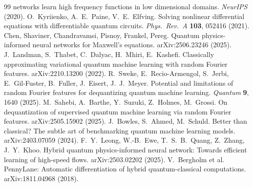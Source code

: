 \documentclass[11pt]{article}
\begin{document}
\begin{thebibliography}{99}
  networks learn high frequency functions in low dimensional domains. \emph{NeurIPS}
  (2020).
 O.~Kyriienko, A.~E.~Paine, V.~E.~Elfving. Solving nonlinear differential
  equations with differentiable quantum circuits. \emph{Phys.\ Rev.\ A} \textbf{103},
  052416 (2021).
 Chen, Shaviner, Chandravamsi, Pisnoy, Frankel, Pereg. Quantum
  physics-informed neural networks for Maxwell's equations. arXiv:2506.23246 (2025).
 J.~Landman, S.~Thabet, C.~Dalyac, H.~Mhiri, E.~Kashefi. Classically
  approximating variational quantum machine learning with random Fourier features.
  arXiv:2210.13200 (2022).
 R.~Sweke, E.~Recio-Armengol, S.~Jerbi, E.~Gil-Fuster, B.~Fuller,
  J.~Eisert, J.~J.~Meyer. Potential and limitations of random Fourier features for
  dequantizing quantum machine learning. \emph{Quantum} \textbf{9}, 1640 (2025).
 M.~Sahebi, A.~Barthe, Y.~Suzuki, Z.~Holmes, M.~Grossi. On
  dequantization of supervised quantum machine learning via random Fourier features.
  arXiv:2505.15902 (2025).
 J.~Bowles, S.~Ahmed, M.~Schuld. Better than classical? The subtle art
  of benchmarking quantum machine learning models. arXiv:2403.07059 (2024).
 F.~Y.~Leong, W.-B.~Ewe, T.~S.~B.~Quang, Z.~Zhang, J.~Y.~Khoo. Hybrid
  quantum physics-informed neural network: Towards efficient learning of high-speed
  flows. arXiv:2503.02202 (2025).
 V.~Bergholm et al. PennyLane: Automatic differentiation of hybrid
  quantum-classical computations. arXiv:1811.04968 (2018).
\end{thebibliography}

\appendix
\end{document}
